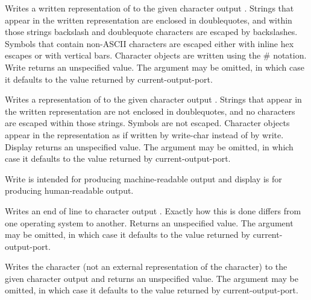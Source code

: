 \begin{entry}{%
}

Writes a written representation of  to the given character output
.  Strings
that appear in the written representation are enclosed in doublequotes, and
within those strings backslash and doublequote characters are
escaped by backslashes.  Symbols that contain non-ASCII characters
are escaped either with inline hex escapes or with vertical bars.
Character objects are written using the {\cf \#\backwhack} notation.
{\cf Write} returns an unspecified value.  The
 argument may be omitted, in which case it defaults to the value
returned by {\cf current-output-port}.

\end{entry}


\begin{entry}{%
}

Writes a representation of  to the given character output .
Strings that appear in the written representation are not enclosed in
doublequotes, and no characters are escaped within those strings.  
Symbols are not escaped.  Character
objects appear in the representation as if written by {\cf write-char}
instead of by {\cf write}.  {\cf Display} returns an unspecified value.
The  argument may be omitted, in which case it defaults to the
value returned by {\cf current-output-port}.

\begin{rationale}
{\cf Write} is intended
for producing mach\-ine-readable output and {\cf display} is for producing
human-readable output.  
\end{rationale}
\end{entry}


\begin{entry}{%
}

Writes an end of line to character output .  Exactly how this
is done differs
from one operating system to another.  Returns an unspecified value.
The  argument may be omitted, in which case it defaults to the
value returned by {\cf current-output-port}.

\end{entry}


\begin{entry}{%
}

Writes the character  (not an external representation of the
character) to the given character output  and returns an unspecified
value.  The
 argument may be omitted, in which case it defaults to the value
returned by {\cf current-output-port}.

\end{entry}

